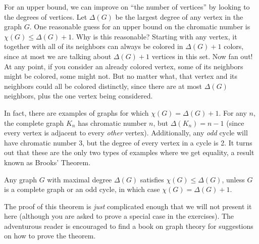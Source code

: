 \documentclass[12pt]{article}
\begin{document}
For an upper bound, we can improve on ``the number of vertices'' by looking to the degrees of vertices.  Let $\Delta(G)$ be the largest degree of any vertex in the graph $G$.  One reasonable guess for an upper bound on the chromatic number is $\chi(G) \le \Delta(G) + 1$.  Why is this reasonable?  Starting with any vertex, it together with all of its neighbors can always be colored in $\Delta(G) + 1$ colors, since at most we are talking about $\Delta(G) + 1$ vertices in this set.  Now fan out!  At any point, if you consider an already colored vertex, some of its neighbors might be colored, some might not.  But no matter what, that vertex and its neighbors could all be colored distinctly, since there are at most $\Delta(G)$ neighbors, plus the one vertex being considered.

In fact, there are examples of graphs for which $\chi(G) = \Delta(G) + 1$.  For any $n$, the complete graph $K_n$ has chromatic number $n$, but $\Delta(K_n) = n-1$ (since every vertex is adjacent to every \emph{other} vertex).  Additionally, any \emph{odd} cycle will have chromatic number 3, but the degree of every vertex in a cycle is 2.  It turns out that these are the only two types of examples where we get equality, a result known as Brooks' Theorem.

\begin{theorem}
Any graph $G$ with maximal degree $\Delta(G)$ satisfies $\chi(G) \le \Delta(G)$, unless $G$ is a complete graph or an odd cycle, in which case $\chi(G) = \Delta(G) + 1$.
\end{theorem}

The proof of this theorem is \emph{just} complicated enough that we will not present it here (although you are asked to prove a special case in the exercises).  The adventurous reader is encouraged to find a book on graph theory for suggestions on how to prove the theorem.
\end{document}
